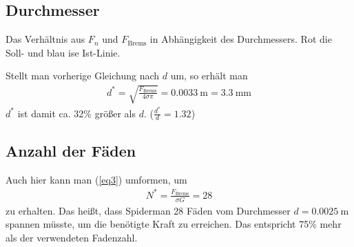 \documentclass[a4paper, 11pt, nofonts, 
twoside, sfsidenotes, nobib, justified]{tufte-handout}
\begin{document}
\subsection{Durchmesser}
\begin{marginfigure}
	\centering
	\caption{Das Verhältnis aus $F_n$ und $F_\text{Brems}$ in Abhängigkeit des Durchmessers. Rot die Soll- und blau ise Ist-Linie.}
	\label{fig4}
\end{marginfigure}
Stellt man vorherige Gleichung nach $d$ um, so erhält man 
\begin{align*}
	d^* = \sqrt{\frac{F_\text{Brems}}{4\sigma\pi}} = \SI{0.0033}{\meter}=\SI{3.3}{\milli\meter}
\end{align*}
$d^*$ ist damit ca. 32\% größer als $d$. ($\frac{d^*}{d}=1.32$)
\subsection{Anzahl der Fäden}
Auch hier kann man (\ref{eq3}) umformen, um 
\begin{align*}
	N^*=\frac{F_\text{Brems}}{\sigma G} = 28
\end{align*}
zu erhalten. Das heißt, dass Spiderman 28 Fäden vom Durchmesser $d=\SI{0.0025}{\meter}$ spannen müsste, um die benötigte Kraft zu erreichen. Das entspricht 75\% mehr als der verwendeten Fadenzahl.
\end{document}
